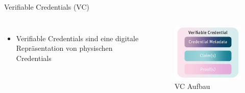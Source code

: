 \documentclass[
	german,%
	authorontitle=true,
	]{bfhbeamer}
\begin{document}
\begin{frame}{Verifiable Credentials (VC)}
    \begin{columns}[onlytextwidth,T]
        \column{70mm}  

    \begin{itemize}
        \item Verifiable Credentials sind eine digitale Repräsentation von physischen Credentials
    \end{itemize}

    \column{70mm}
    \begin{figure}
        \centering
        \includegraphics[width=70mm]{../img/VC.png}
        \caption{VC Aufbau}
    \end{figure}

    \end{columns}
\end{frame}
\end{document}
